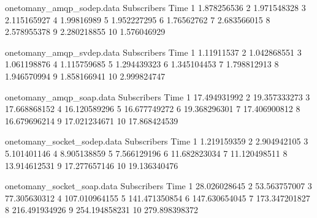 \begin{filecontents}{onetomany_amqp_sodep.data}
Subscribers Time
1  1.878256536
2  1.971548328
3  2.115165927
4  1.99816989
5  1.952227295
6  1.76562762
7  2.683566015
8  2.578955378
9  2.280218855
10 1.576046929
\end{filecontents}

\begin{filecontents}{onetomany_amqp_svdep.data}
Subscribers Time
1  1.11911537
2  1.042868551
3  1.061198876
4  1.115759685
5  1.294439323
6  1.345104453
7  1.798812913
8  1.946570994
9  1.858166941
10 2.999824747
\end{filecontents}

\begin{filecontents}{onetomany_amqp_soap.data}
Subscribers Time
1  17.494931992
2  19.357333273
3  17.668868152
4  16.120589296
5  16.677749272
6  19.368296301
7  17.406900812
8  16.679696214
9  17.021234671
10 17.868424539
\end{filecontents}

\begin{filecontents}{onetomany_socket_sodep.data}
Subscribers Time
1  1.219159359
2  2.904942105
3  5.101401146
4  8.905138859
5  7.566129196
6  11.682823034
7  11.120498511
8  13.914612531
9  17.277657146
10 19.136340476
\end{filecontents}

\begin{filecontents}{onetomany_socket_soap.data}
Subscribers Time
1  28.026028645
2  53.563757007
3  77.305630312
4  107.010964155
5  141.471350854
6  147.630654045
7  173.347201827
8  216.491934926
9  254.194858231
10 279.898398372
\end{filecontents}
